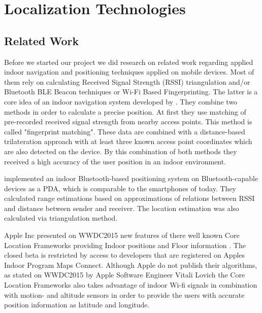 \chapter{Localization Technologies}
\label{cha:relatedwork}


\section{Related Work}
Before we started our project we did research on related work regarding applied indoor navigation and positioning techniques applied on mobile devices. Most of them rely on calculating Received Signal Strength (RSSI) triangulation and/or Bluetooth BLE Beacon techniques or Wi-Fi Based Fingerprinting. The latter is a core idea of an indoor navigation system developed by \cite{ChaSo2012}. They combine two methods in order to calculate a precise position. At first they use matching of pre-recorded received signal strength from nearby access points. This method is called "fingerprint matching". These data are combined with a distance-based trilateration approach with at least three known access point coordinates which are also detected on the device. By this combination of both methods they received a high accuracy of the user position in an indoor environment.

\cite{FelKyaZap2012} implemented an indoor Bluetooth-based positioning system on Bluetooth-capable devices as a PDA, which is comparable to the smartphones of today. They calculated range estimations based on approximations of relations between RSSI and distance between sender and receiver. The location estimation was also calculated via triangulation method.
 
Apple Inc presented on WWDC2015 new features of there well known Core Location Frameworks providing Indoor positions and Floor information \cite{wwdc15}. The closed beta is restricted by access to developers that are registered on Apples Indoor Program Maps Connect. Although Apple do not publish their algorithms, as stated on WWDC2015 by Apple Software Engineer Vitali Lovich
the Core Location Frameworks also takes advantage of indoor Wi-fi signals in combination with motion- and altitude sensors in order to provide the users with accurate position information as latitude and longitude.

